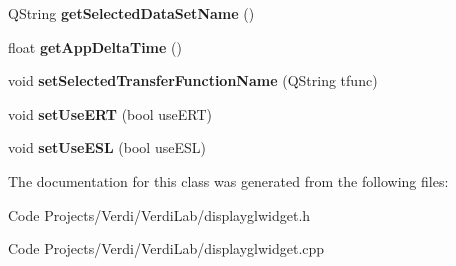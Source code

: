 \begin{DoxyCompactItemize}
\item 
\hypertarget{class_display_g_l_widget_a43edb1af289ddc0fa4e1bde9b629831b}{\-Q\-String {\bfseries get\-Selected\-Data\-Set\-Name} ()}\label{class_display_g_l_widget_a43edb1af289ddc0fa4e1bde9b629831b}

\item 
\hypertarget{class_display_g_l_widget_a66ed09e69ea3ac7b3163f1129e50f6ca}{float {\bfseries get\-App\-Delta\-Time} ()}\label{class_display_g_l_widget_a66ed09e69ea3ac7b3163f1129e50f6ca}

\item 
\hypertarget{class_display_g_l_widget_a00d79a8e97f92d57a90e31dc487f9ff1}{void {\bfseries set\-Selected\-Transfer\-Function\-Name} (\-Q\-String tfunc)}\label{class_display_g_l_widget_a00d79a8e97f92d57a90e31dc487f9ff1}

\item 
\hypertarget{class_display_g_l_widget_a5c1d5081a19aa61257ad2ff74e76eff2}{void {\bfseries set\-Use\-E\-R\-T} (bool use\-E\-R\-T)}\label{class_display_g_l_widget_a5c1d5081a19aa61257ad2ff74e76eff2}

\item 
\hypertarget{class_display_g_l_widget_addbe62e0914a916a736d081c23aa97cf}{void {\bfseries set\-Use\-E\-S\-L} (bool use\-E\-S\-L)}\label{class_display_g_l_widget_addbe62e0914a916a736d081c23aa97cf}

\end{DoxyCompactItemize}


\-The documentation for this class was generated from the following files\-:\begin{DoxyCompactItemize}
\item 
\-Code Projects/\-Verdi/\-Verdi\-Lab/displayglwidget.\-h\item 
\-Code Projects/\-Verdi/\-Verdi\-Lab/displayglwidget.\-cpp\end{DoxyCompactItemize}
